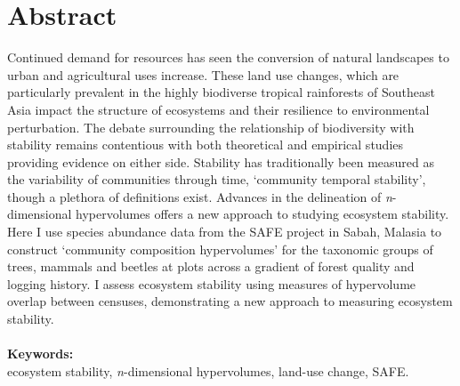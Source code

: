 \section{Abstract}

Continued demand for resources has seen the conversion of natural landscapes to urban and agricultural uses increase. These land use changes, which are particularly prevalent  in the highly biodiverse tropical rainforests of Southeast Asia impact the structure of ecosystems and their resilience to environmental perturbation. The debate surrounding the relationship of biodiversity with stability remains contentious with both theoretical and empirical studies providing evidence on either side. Stability has traditionally been measured as the variability of communities through time, `community temporal stability', though a plethora of definitions exist. Advances in the delineation of \emph{n}-dimensional hypervolumes offers a new approach to studying ecosystem stability. Here I use species abundance data from the SAFE project in Sabah, Malasia to construct `community composition hypervolumes' for the taxonomic groups of trees, mammals and beetles at plots across a gradient of forest quality and logging history. I assess ecosystem stability using measures of hypervolume overlap between censuses, demonstrating a new approach to measuring ecosystem stability.
\\
\\

\textbf{Keywords:} 
\\ ecosystem stability, \emph{n}-dimensional hypervolumes, land-use change, SAFE.